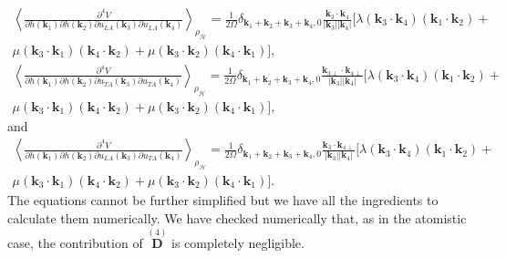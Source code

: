 \begin{multline}
	\left\langle\frac{\partial^{4}V}{\partial h(\boldsymbol{k}_{1})\partial h(\boldsymbol{k}_{2})\partial u_{LA}(\boldsymbol{k}_{3})\partial u_{LA}(\boldsymbol{k}_{4})}\right\rangle_{\rho_{\mathcal{H}}}=\frac{1}{2\Omega}\delta_{\boldsymbol{
 k}_{1}+\boldsymbol{k}_{2}+\boldsymbol{k}_{3}+\boldsymbol{k}_{4},0}\frac{\boldsymbol{k}_{3}\cdot\boldsymbol{k}_{4}}{|\boldsymbol{k}_{3}||\boldsymbol{k}_{4}|}[\lambda(\boldsymbol{k}_{3}\cdot\boldsymbol{k}_{4})(\boldsymbol{k}_{
 1}\cdot\boldsymbol{k}_{2})+\\\mu(\boldsymbol{k}_{3}\cdot\boldsymbol{k}_{1})(\boldsymbol{k}_{4}\cdot\boldsymbol{k}_{2})+\mu(\boldsymbol{k}_{3}\cdot\boldsymbol{k}_{2})(\boldsymbol{k}_{4}\cdot\boldsymbol{k}_{1})],
\end{multline}
\begin{multline}
	\left\langle\frac{\partial^{4}V}{\partial h(\boldsymbol{k}_{1})\partial h(\boldsymbol{k}_{2})\partial u_{TA}(\boldsymbol{k}_{3})\partial u_{TA}(\boldsymbol{k}_{4})}\right\rangle_{\rho_{\mathcal{H}}}=\frac{1}{2\Omega}\delta_{\boldsymbol{
 k}_{1}+\boldsymbol{k}_{2}+\boldsymbol{k}_{3}+\boldsymbol{k}_{4},0}\frac{\boldsymbol{k}_{3\perp}\cdot\boldsymbol{k}_{4\perp}}{|\boldsymbol{k}_{3}||\boldsymbol{k}_{4}|}[\lambda(\boldsymbol{k}_{3}\cdot\boldsymbol{k}_{4})(\boldsymbol{k}_{
 1}\cdot\boldsymbol{k}_{2})+\\\mu(\boldsymbol{k}_{3}\cdot\boldsymbol{k}_{1})(\boldsymbol{k}_{4}\cdot\boldsymbol{k}_{2})+\mu(\boldsymbol{k}_{3}\cdot\boldsymbol{k}_{2})(\boldsymbol{k}_{4}\cdot\boldsymbol{k}_{1})],
\end{multline}
and
\begin{multline}
	\left\langle\frac{\partial^{4}V}{\partial h(\boldsymbol{k}_{1})\partial h(\boldsymbol{k}_{2})\partial u_{LA}(\boldsymbol{k}_{3})\partial u_{TA}(\boldsymbol{k}_{4})}\right\rangle_{\rho_{\mathcal{H}}}=\frac{1}{2\Omega}\delta_{\boldsymbol{
 k}_{1}+\boldsymbol{k}_{2}+\boldsymbol{k}_{3}+\boldsymbol{k}_{4},0}\frac{\boldsymbol{k}_{3}\cdot\boldsymbol{k}_{4\perp}}{|\boldsymbol{k}_{3}||\boldsymbol{k}_{4}|}[\lambda(\boldsymbol{k}_{3}\cdot\boldsymbol{k}_{4})(\boldsymbol{k}_{
 1}\cdot\boldsymbol{k}_{2})+\\\mu(\boldsymbol{k}_{3}\cdot\boldsymbol{k}_{1})(\boldsymbol{k}_{4}\cdot\boldsymbol{k}_{2})+\mu(\boldsymbol{k}_{3}\cdot\boldsymbol{k}_{2})(\boldsymbol{k}_{4}\cdot\boldsymbol{k}_{1})].
\end{multline}
The equations cannot be further simplified but we have all the ingredients to calculate them numerically. We have
checked numerically that, as in the atomistic case, the contribution of $\overset{(4)}{\boldsymbol{D}}$ is
completely negligible. \\

